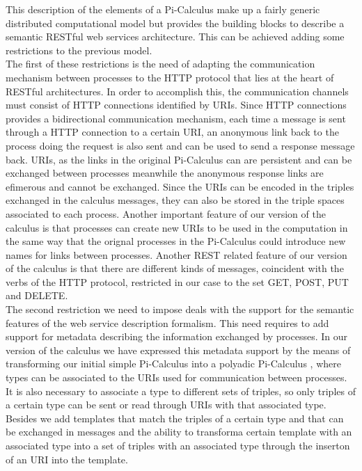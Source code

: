 This description of the elements of a Pi-Calculus make up a fairly generic distributed computational model but
provides the building blocks to describe a semantic RESTful web services architecture. This can be achieved adding some
restrictions to the previous model. \\

The first of these restrictions is the need of adapting the communication mechanism between processes to the HTTP
protocol that lies at the heart of RESTful architectures. In order to accomplish this, the communication channels must
consist of HTTP connections identified by URIs. Since HTTP connections provides a bidirectional communication mechanism,
each time a message is sent through a HTTP connection to a certain URI, an anonymous link back to the process doing the
request is also sent and can be used to send a response message back. URIs, as the links in the original Pi-Calculus can
are persistent and can be exchanged between processes meanwhile the anonymous response links are efimerous and cannot be
exchanged. Since the URIs can be encoded in the triples exchanged in the calculus messages, they can also be stored in
the triple spaces associated to each process. Another important feature of our version of the calculus is that processes
can create new URIs to be used in the computation in the same way that the orignal processes in the Pi-Calculus could
introduce new names for links between processes. Another REST related feature of our version of the calculus is that
there are different kinds of messages, coincident with the verbs of the HTTP protocol, restricted in our case to the set
GET, POST, PUT and  DELETE.\\

The second restriction we need to impose deals with the support for the semantic features of the web service description
formalism. This need requires to add support for metadata describing the information exchanged by processes. In our
version of the calculus we have expressed this metadata support by the means of transforming our initial simple
Pi-Calculus into a polyadic Pi-Calculus \cite{Milner91thepolyadic}, where types can be associated to the URIs used for communication between
processes. It is also necessary to associate a type to different sets of triples, so only triples of a certain type can
be sent or read through URIs with that associated type. Besides we add templates that match the triples of a certain
type and that can be exchanged in messages and the ability to transforma certain template with an associated type into a
set of triples with an associated type through the inserton of an URI into the template.\\


